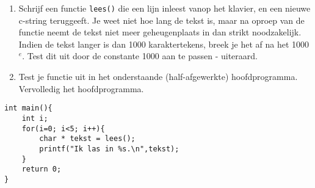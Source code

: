 \beginoef
\begin{enumerate}
\item 
Schrijf een functie \verb}lees()} die een lijn inleest vanop het klavier, en een nieuwe c-string teruggeeft. Je weet niet hoe lang de tekst is, maar na oproep van de functie neemt de tekst
niet meer geheugenplaats in dan strikt noodzakelijk. Indien de tekst langer is dan 1000 karaktertekens, breek je het af na het 1000$^e$. Test dit uit door de constante 1000 aan te passen - uiteraard.
\item
Test je functie uit in het onderstaande (half-afgewerkte) hoofdprogramma. 
Vervolledig het hoofdprogramma.
\end{enumerate}
\begin{verbatim}
int main(){
    int i;
    for(i=0; i<5; i++){    
        char * tekst = lees();
        printf("Ik las in %s.\n",tekst);
    }	
    return 0;
}
\end{verbatim}

\endoef

